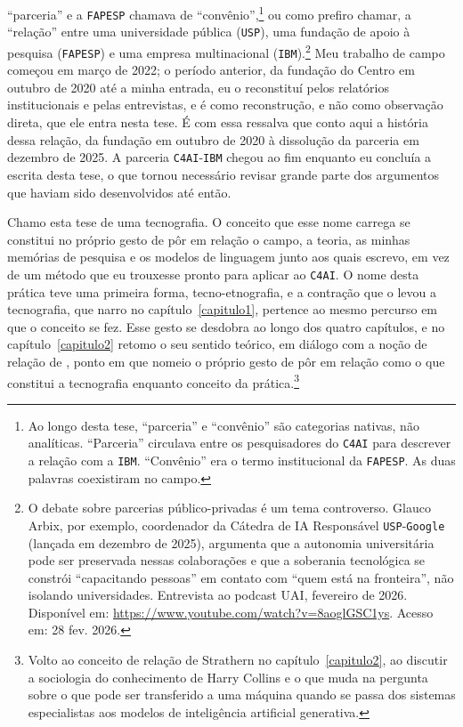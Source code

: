 \enquote{parceria} e a \texttt{FAPESP} chamava de \enquote{convênio},\footnote{Ao longo desta tese, \enquote{parceria} e \enquote{convênio} são categorias nativas, não analíticas. \enquote{Parceria} circulava entre os pesquisadores do \texttt{C4AI} para descrever a relação com a \texttt{IBM}. \enquote{Convênio} era o termo institucional da \texttt{FAPESP}. As duas palavras coexistiram no campo.} ou como prefiro chamar, a \enquote{relação} entre uma universidade pública (\texttt{USP}), uma fundação de apoio à pesquisa (\texttt{FAPESP}) e uma empresa multinacional (\texttt{IBM}).\footnote{O debate sobre parcerias público-privadas é um tema controverso. Glauco Arbix, por exemplo, coordenador da Cátedra de IA Responsável \texttt{USP}-\texttt{Google} (lançada em dezembro de 2025), argumenta que a autonomia universitária pode ser preservada nessas colaborações e que a soberania tecnológica se constrói \enquote{capacitando pessoas} em contato com \enquote{quem está na fronteira}, não isolando universidades. Entrevista ao podcast UAI, fevereiro de 2026. Disponível em: \url{https://www.youtube.com/watch?v=8aoglGSC1ys}. Acesso em: 28 fev. 2026.} Meu trabalho de campo começou em março de 2022; o período anterior, da fundação do Centro em outubro de 2020 até a minha entrada, eu o reconstituí pelos relatórios institucionais e pelas entrevistas, e é como reconstrução, e não como observação direta, que ele entra nesta tese. É com essa ressalva que conto aqui a história dessa relação, da fundação em outubro de 2020 à dissolução da parceria em dezembro de 2025. A parceria \texttt{C4AI}-\texttt{IBM} chegou ao fim enquanto eu concluía a escrita desta tese, o que tornou necessário revisar grande parte dos argumentos que haviam sido desenvolvidos até então.

Chamo esta tese de uma tecnografia. O conceito que esse nome carrega se constitui no próprio gesto de pôr em relação o campo, a teoria, as minhas memórias de pesquisa e os modelos de linguagem junto aos quais escrevo, em vez de um método que eu trouxesse pronto para aplicar ao \texttt{C4AI}. O nome desta prática teve uma primeira forma, tecno-etnografia, e a contração que o levou a tecnografia, que narro no capítulo~\ref{capitulo1}, pertence ao mesmo percurso em que o conceito se fez. Esse gesto se desdobra ao longo dos quatro capítulos, e no capítulo~\ref{capitulo2} retomo o seu sentido teórico, em diálogo com a noção de relação de \textcite{strathern1995relation}, ponto em que nomeio o próprio gesto de pôr em relação como o que constitui a tecnografia enquanto conceito da prática.\footnote{Volto ao conceito de relação de Strathern no capítulo~\ref{capitulo2}, ao discutir a sociologia do conhecimento de Harry Collins e o que muda na pergunta sobre o que pode ser transferido a uma máquina quando se passa dos sistemas especialistas aos modelos de inteligência artificial generativa.}

